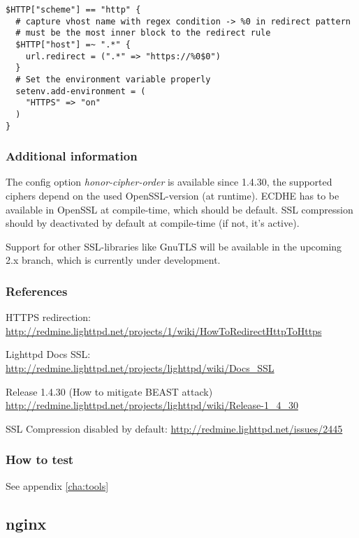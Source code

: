 \begin{lstlisting}
$HTTP["scheme"] == "http" {
  # capture vhost name with regex condition -> %0 in redirect pattern
  # must be the most inner block to the redirect rule
  $HTTP["host"] =~ ".*" {
    url.redirect = (".*" => "https://%0$0")
  }
  # Set the environment variable properly
  setenv.add-environment = (
    "HTTPS" => "on"
  )
}
\end{lstlisting}


\subsubsection{Additional information} 
The config option \emph{honor-cipher-order} is available since 1.4.30, the
supported ciphers depend on the used OpenSSL-version (at runtime). ECDHE has to
be available in OpenSSL at compile-time, which should be default. SSL
compression should by deactivated by default at compile-time (if not, it's
active).

Support for other SSL-libraries like GnuTLS will be available in the upcoming
2.x branch, which is currently under development.


\subsubsection{References} 
\begin{itemize*}
  \item HTTPS redirection: \url{http://redmine.lighttpd.net/projects/1/wiki/HowToRedirectHttpToHttps}
  \item Lighttpd Docs SSL: \url{http://redmine.lighttpd.net/projects/lighttpd/wiki/Docs\_SSL}
  \item Release 1.4.30 (How to mitigate BEAST attack) \url{http://redmine.lighttpd.net/projects/lighttpd/wiki/Release-1\_4\_30}
  \item SSL Compression disabled by default: \url{http://redmine.lighttpd.net/issues/2445}
\end{itemize*}


\subsubsection{How to test} 
See appendix \ref{cha:tools}


\subsection{nginx}

